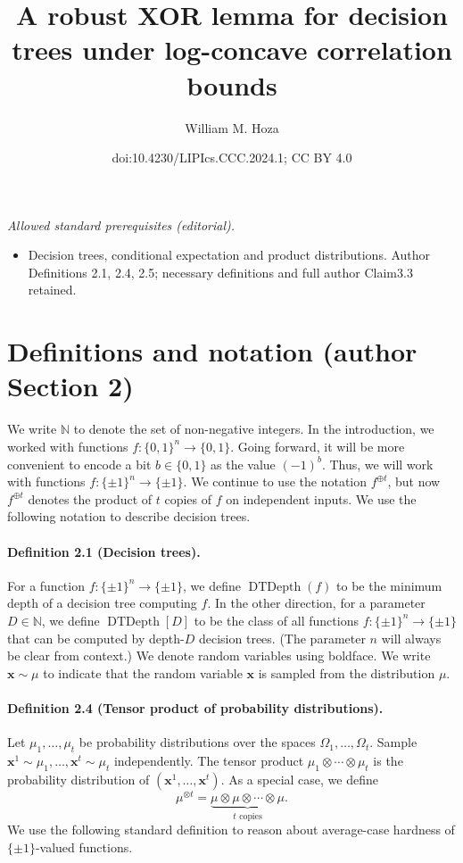 \documentclass[10pt,a4paper]{article}
\title{A robust XOR lemma for decision trees under log-concave correlation bounds}
\author{William M. Hoza}
\date{doi:10.4230/LIPIcs.CCC.2024.1; CC BY 4.0}
\newcommand{\DT}{\operatorname{DTDepth}}
\begin{document}
\maketitle
\noindent\textit{Allowed standard prerequisites (editorial).}\begin{itemize}
\item Decision trees, conditional expectation and product distributions. Author Definitions 2.1, 2.4, 2.5; necessary definitions and full author Claim3.3 retained.
\end{itemize}\medskip
\section*{Definitions and notation (author Section 2)}
We write $\mathbb N$ to denote the set of non-negative integers.
In the introduction, we worked with functions $f:\{0,1\}^n\to\{0,1\}$. Going forward, it will be more convenient to encode a bit $b\in\{0,1\}$ as the value $(-1)^b$. Thus, we will work with functions $f:\{\pm1\}^n\to\{\pm1\}$. We continue to use the notation $f^{\oplus t}$, but now $f^{\oplus t}$ denotes the product of $t$ copies of $f$ on independent inputs.
We use the following notation to describe decision trees.
\paragraph{Definition 2.1 (Decision trees).} For a function $f:\{\pm1\}^n\to\{\pm1\}$, we define $\DT(f)$ to be the minimum depth of a decision tree computing $f$. In the other direction, for a parameter $D\in\mathbb N$, we define $\DT[D]$ to be the class of all functions $f:\{\pm1\}^n\to\{\pm1\}$ that can be computed by depth-$D$ decision trees. (The parameter $n$ will always be clear from context.)
We denote random variables using boldface. We write $\mathbf x\sim\mu$ to indicate that the random variable $\mathbf x$ is sampled from the distribution $\mu$.
\paragraph{Definition 2.4 (Tensor product of probability distributions).} Let $\mu_1,\ldots,\mu_t$ be probability distributions over the spaces $\Omega_1,\ldots,\Omega_t$. Sample $\mathbf x^1\sim\mu_1,\ldots,\mathbf x^t\sim\mu_t$ independently. The tensor product $\mu_1\otimes\cdots\otimes\mu_t$ is the probability distribution of $(\mathbf x^1,\ldots,\mathbf x^t)$. As a special case, we define
\[\mu^{\otimes t}=\underbrace{\mu\otimes\mu\otimes\cdots\otimes\mu}_{t\text{ copies}}.\]
We use the following standard definition to reason about average-case hardness of $\{\pm1\}$-valued functions.
\end{document}
